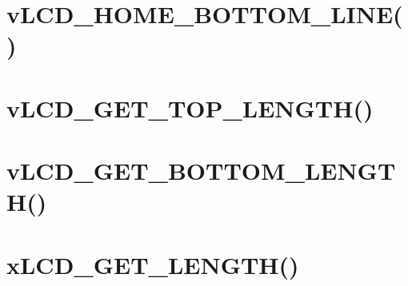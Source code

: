  \hypertarget{_flowcharts_bottomhome}{}\section{v\-L\-C\-D\-\_\-\-H\-O\-M\-E\-\_\-\-B\-O\-T\-T\-O\-M\-\_\-\-L\-I\-N\-E()}\label{_flowcharts_bottomhome}
 \hypertarget{_flowcharts_gettop}{}\section{v\-L\-C\-D\-\_\-\-G\-E\-T\-\_\-\-T\-O\-P\-\_\-\-L\-E\-N\-G\-T\-H()}\label{_flowcharts_gettop}
 \hypertarget{_flowcharts_getbottom}{}\section{v\-L\-C\-D\-\_\-\-G\-E\-T\-\_\-\-B\-O\-T\-T\-O\-M\-\_\-\-L\-E\-N\-G\-T\-H()}\label{_flowcharts_getbottom}
 \hypertarget{_flowcharts_getlength}{}\section{x\-L\-C\-D\-\_\-\-G\-E\-T\-\_\-\-L\-E\-N\-G\-T\-H()}\label{_flowcharts_getlength}
